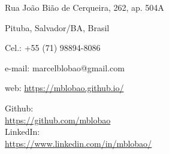 \documentclass{cv}
\author{Marcel Britto Lobão}  %
\begin{document}
    \begin{minipage}[t]{0.6\textwidth}
        \name
        
        \vspace{6pt}
        \normalsize{}
    \end{minipage}
    \hfill
    \begin{minipage}[t]{0.6\textwidth}  %
        Rua João Bião de Cerqueira, 262, ap. 504A
        
        Pituba, Salvador/BA, Brasil
        
        Cel.: +55 (71) 98894-8086
        
        e-mail: marcelblobao@gmail.com

        web: \href{https://mblobao.github.io/}{https://mblobao.github.io/}
    \end{minipage}
    
    \vspace{2mm}

    \begin{minipage}[t]{0.3\textwidth}
            Github:\\ \href{https://github.com/mblobao}{https://github.com/mblobao}\\
            LinkedIn:\\ \href{https://www.linkedin.com/in/mblobao/}{https://www.linkedin.com/in/mblobao/}
            
            \\
        
        
        
        
        
    \end{minipage}
    \hfill
    \begin{minipage}[t]{0.65\textwidth} 
    
        
        
        
    \end{minipage}
\end{document}
